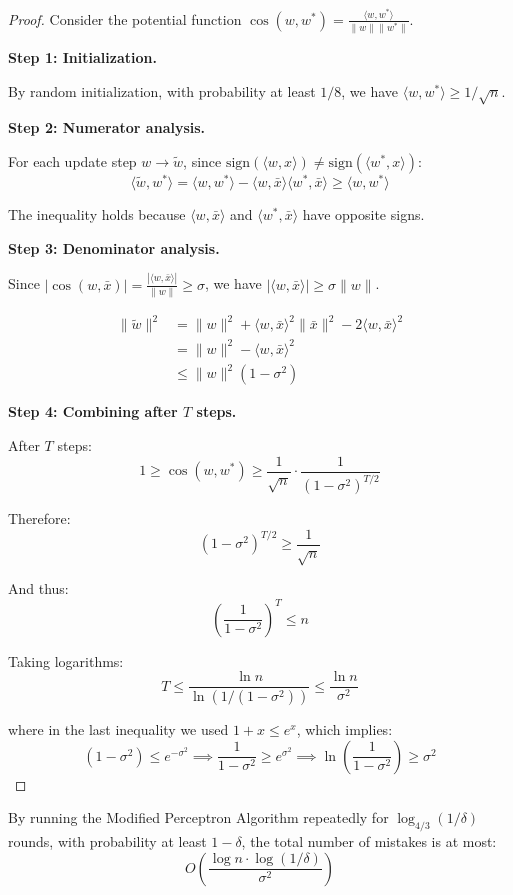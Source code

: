 \documentclass[main.tex]{subfiles}
\begin{document}
\begin{proof}
Consider the potential function $\cos(w, w^*) = \frac{\langle w, w^* \rangle}{\|w\| \|w^*\|}$.

\textbf{Step 1: Initialization.}

By random initialization, with probability at least $1/8$, we have $\langle w, w^* \rangle \geq 1/\sqrt{n}$.

\textbf{Step 2: Numerator analysis.}

For each update step $w \to \tilde{w}$, since $\text{sign}(\langle w, x \rangle) \neq \text{sign}(\langle w^*, x \rangle)$:
$$\langle \tilde{w}, w^* \rangle = \langle w, w^* \rangle - \langle w, \bar{x} \rangle \langle w^*, \bar{x} \rangle \geq \langle w, w^* \rangle$$

The inequality holds because $\langle w, \bar{x} \rangle$ and $\langle w^*, \bar{x} \rangle$ have opposite signs.

\textbf{Step 3: Denominator analysis.}

Since $|\cos(w, \bar{x})| = \frac{|\langle w, \bar{x} \rangle|}{\|w\|} \geq \sigma$, we have $|\langle w, \bar{x} \rangle| \geq \sigma\|w\|$.

\begin{align}
\|\tilde{w}\|^2 &= \|w\|^2 + \langle w, \bar{x} \rangle^2 \|\bar{x}\|^2 - 2\langle w, \bar{x} \rangle^2 \\[6pt]
&= \|w\|^2 - \langle w, \bar{x} \rangle^2 \\[6pt]
&\leq \|w\|^2(1 - \sigma^2)
\end{align}

\textbf{Step 4: Combining after $T$ steps.}

After $T$ steps:
$$1 \geq \cos(w, w^*) \geq \frac{1}{\sqrt{n}} \cdot \frac{1}{(1-\sigma^2)^{T/2}}$$

Therefore:
$$(1 - \sigma^2)^{T/2} \geq \frac{1}{\sqrt{n}}$$

And thus:
$$\left(\frac{1}{1-\sigma^2}\right)^T \leq n$$

Taking logarithms:
$$T \leq \frac{\ln n}{\ln(1/(1-\sigma^2))} \leq \frac{\ln n}{\sigma^2}$$

where in the last inequality we used $1 + x \leq e^x$, which implies:
$$(1 - \sigma^2) \leq e^{-\sigma^2} \implies \frac{1}{1-\sigma^2} \geq e^{\sigma^2} \implies \ln\left(\frac{1}{1-\sigma^2}\right) \geq \sigma^2$$
\end{proof}

\begin{corollary}
By running the Modified Perceptron Algorithm repeatedly for $\log_{4/3}(1/\delta)$ rounds, with probability at least $1 - \delta$, the total number of mistakes is at most:
$$O\left(\frac{\log n \cdot \log(1/\delta)}{\sigma^2}\right)$$
\end{corollary}
\end{document}
